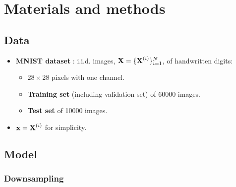 \section{Materials and methods}
\label{sec:method}

\subsection{Data}
\label{sub:data}
\begin{itemize}
	\item \textbf{MNIST dataset} \cite{MNIST}: i.i.d. images, $\bm{\mathrm{X}} = \{\bm{\mathrm{X}}^{(i)}\}^N_{i=1}$, of handwritten digits:
	\begin{itemize}
		\item $28 \times 28$ pixels with one channel.
		\item \textbf{Training set} (including validation set) of 60000 images.
		\item \textbf{Test set} of 10000 images.
	\end{itemize}
	\item $\bm{\mathrm{x}} = \bm{\mathrm{X}}^{(i)}$ for simplicity.
\end{itemize}

\subsection{Model} %
\label{sub:the_model}

\begin{columnfigure}
	\centering
	
	\label{fig:diagram}
\end{columnfigure}

%

\subsubsection{Downsampling}
\label{ssub:downsampling}

